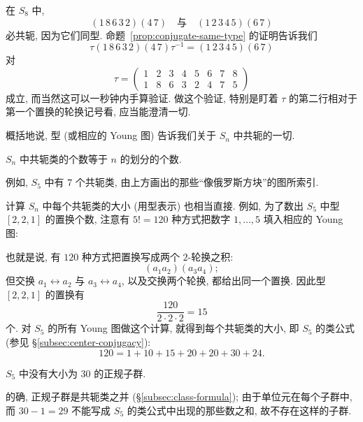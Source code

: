 \begin{example}
\label{ex:conjugate-same-type}
在 $S_8$ 中,
\[
(1\,8\,6\,3\,2)(4\,7)\quad\text{与}\quad (1\,2\,3\,4\,5)(6\,7)
\]
必共轭, 因为它们同型. 命题~\ref{prop:conjugate-same-type} 的证明告诉我们
\[
\tau(1\,8\,6\,3\,2)(4\,7)\tau^{-1} = (1\,2\,3\,4\,5)(6\,7)
\]
对
\[
\tau = \begin{pmatrix} 1 & 2 & 3 & 4 & 5 & 6 & 7 & 8 \\ 1 & 8 & 6 & 3 & 2 & 4 & 7 & 5 \end{pmatrix}
\]
成立, 而当然这可以一秒钟内手算验证. 做这个验证, 特别是盯着 $\tau$ 的第二行相对于第一个置换的轮换记号看, 应当能澄清一切.
\end{example}

概括地说, 型 (或相应的 Young 图) 告诉我们关于 $S_n$ 中共轭的一切.

\begin{corollary}
\label{cor:conjugacy-classes-sn}
$S_n$ 中共轭类的个数等于 $n$ 的划分的个数.
\end{corollary}

例如, $S_5$ 中有 $7$ 个共轭类, 由上方画出的那些``像俄罗斯方块''的图所索引.

计算 $S_n$ 中每个共轭类的大小 (用型表示) 也相当直接. 例如, 为了数出 $S_5$ 中型 $[2,2,1]$ 的置换个数, 注意有 $5! = 120$ 种方式把数字 $1,\dots,5$ 填入相应的 Young 图:
\begin{center}
\end{center}
也就是说, 有 $120$ 种方式把置换写成两个 $2$-轮换之积:
\[
(a_1 a_2)(a_3 a_4);
\]
但交换 $a_1 \leftrightarrow a_2$ 与 $a_3 \leftrightarrow a_4$, 以及交换两个轮换, 都给出同一个置换. 因此型 $[2,2,1]$ 的置换有
\[
\frac{120}{2 \cdot 2 \cdot 2} = 15
\]
个. 对 $S_5$ 的所有 Young 图做这个计算, 就得到每个共轭类的大小, 即 $S_5$ 的类公式 (参见 \S\ref{subsec:center-conjugacy}):
\[
120 = 1 + 10 + 15 + 20 + 20 + 30 + 24.
\]

\begin{example}
\label{ex:no-normal-30-s5}
$S_5$ 中没有大小为 $30$ 的正规子群.

的确, 正规子群是共轭类之并 (\S\ref{subsec:class-formula}); 由于单位元在每个子群中, 而 $30 - 1 = 29$ 不能写成 $S_5$ 的类公式中出现的那些数之和, 故不存在这样的子群.
\end{example}

